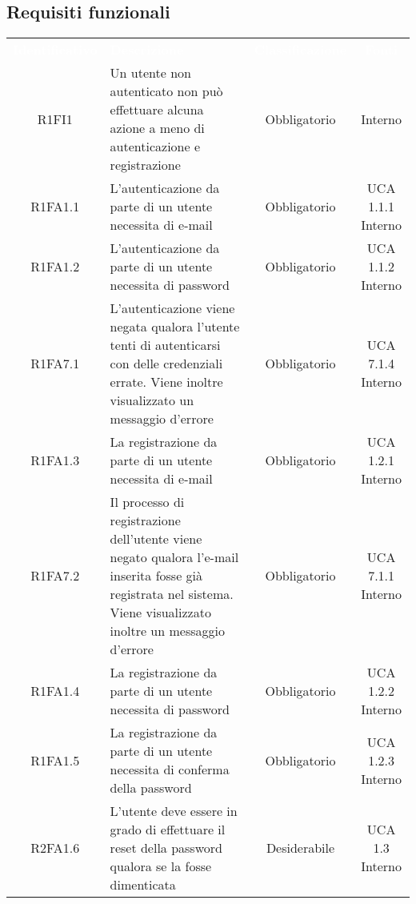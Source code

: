 \renewcommand{\o}{Obbligatorio}
\renewcommand{\d}{Desiderabile}
\newcommand{\op}{Opzionale}
\subsection{Requisiti funzionali}
{
\renewcommand{\arraystretch}{1.5}
\centering
\begin{longtable}{ c C{4cm} c c}
\textcolor{white}{\textbf{Identificativo}} & \textcolor{white}{\textbf{Descrizione}} & \textcolor{white}{\textbf{Classificazione}} & \textcolor{white}{\textbf{Fonti}}\\	

R1FI1 & Un utente non autenticato non può effettuare alcuna azione a meno di autenticazione e registrazione & Obbligatorio & Interno\\

R1FA1.1 & L'autenticazione da parte di un utente necessita di e-mail & Obbligatorio & UCA 1.1.1 Interno\\

R1FA1.2 & L'autenticazione da parte di un utente necessita di password & Obbligatorio & UCA 1.1.2 Interno\\

R1FA7.1 & L'autenticazione viene negata qualora l'utente tenti di autenticarsi con delle credenziali errate. Viene inoltre visualizzato un messaggio d'errore & Obbligatorio & UCA 7.1.4 Interno\\

R1FA1.3 & La registrazione da parte di un utente necessita di e-mail & Obbligatorio & UCA 1.2.1 Interno\\

R1FA7.2 & Il processo di registrazione dell'utente viene negato qualora l'e-mail inserita fosse già registrata nel sistema. Viene visualizzato inoltre un messaggio d'errore & Obbligatorio & UCA 7.1.1 Interno\\

R1FA1.4 & La registrazione da parte di un utente necessita di password & Obbligatorio & UCA 1.2.2 Interno\\

R1FA1.5 & La registrazione da parte di un utente necessita di conferma della password & Obbligatorio & UCA 1.2.3 Interno\\

R2FA1.6 & L'utente deve essere in grado di effettuare il reset della password qualora se la fosse dimenticata & Desiderabile & UCA 1.3 Interno\\


\end{longtable}}
